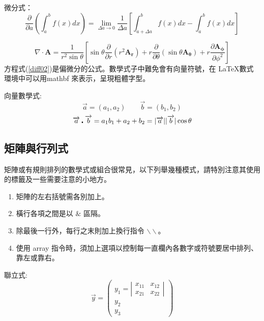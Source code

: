 微分式：
\begin{equation}\label{diff01}
\frac{\partial}{\partial a}\left(\int^b_a f(x)dx\right)=\lim_{\Delta a \rightarrow 0}\frac{1}{\Delta a}\left[\int^b_{a+\Delta a} f(x)dx-\int^b_a f(x)dx\right]
\end{equation}



\begin{equation}\label{diff02}
\nabla\cdot\mathbf{A}=\frac{1}{r^{2}\sin\theta}\left[\sin\theta\frac{\partial }{\partial r}(r^{2}\mathbf{A_r})+r\frac{\partial}{\partial\theta}(\sin\theta \mathbf{A_\theta})+r\frac{\partial \mathbf{A_\phi}}{\partial\phi^{2}}\right]
 \end{equation}
方程式(\ref{diff02})是偏微分的公式。數學式子中難免會有向量符號，在 \LaTeX 數式環境中可以用\A mathbf 來表示，呈現粗體字型。

向量數學式:
$$
\overrightarrow{a}=(a_1,a_2) \qquad \overrightarrow{b}=(b_1,b_2)
$$
$$
\overrightarrow{a}\centerdot \overrightarrow{b}=a_1b_1+a_2+b_2= \arrowvert \overrightarrow{a} \arrowvert  \arrowvert \overrightarrow{b} \arrowvert\cos\theta
$$
\subsection{矩陣與行列式}
矩陣或有規則排列的數學式或組合很常見，以下列舉幾種模式，請特別注意其使用的標籤及一些需要注意的小地方。

\begin{enumerate} 
  \item 矩陣的左右括號需各別加上。
  \item 橫行各項之間是以 $\&$ 區隔。
  \item 除最後一行外，每行之末則加上換行指令 $\backslash\backslash$。
  \item 使用 {\A array} 指令時，須加上選項以控制每一直欄內各數字或符號要居中排列、靠左或靠右。
\end{enumerate}

聯立式:
\begin{equation}\label{01}
\vec{y} =
\left( \begin{array}{cc}
y_{1} =
\left| \begin{array}{cc}
x_{11} & x_{12} \\
x_{21} & x_{22}
\end{array} \right| \\
y_{2} \\
y_{3}
\end{array} \right)
\end{equation}


